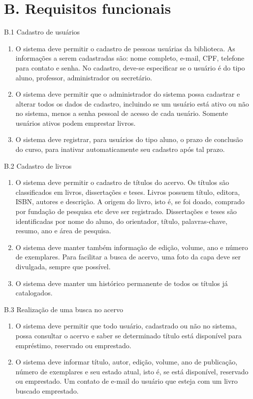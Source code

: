 \documentclass[a4paper]{article}
\begin{document}
	\section*{B. Requisitos funcionais}
	B.1 Cadastro de usuários
		\begin{enumerate}
			\item O sistema deve permitir o cadastro de pessoas usuárias da biblioteca. As informações a serem cadastradas são: nome completo, e-mail, CPF, telefone para contato e senha. No cadastro, deve-se especificar se o usuário é do tipo aluno, professor, administrador ou secretário.
			\item O sistema deve permitir que o administrador do sistema possa cadastrar e alterar todos os dados de cadastro, incluindo se um usuário está ativo ou não no sistema, menos a senha pessoal de acesso de cada usuário. Somente usuários ativos podem emprestar livros.
			\item O sistema deve registrar, para usuários do tipo aluno, o prazo de conclusão do curso, para inativar automaticamente seu cadastro após tal prazo.
		\end{enumerate}
	B.2 Cadastro de livros
		\begin{enumerate}[resume]
			\item O sistema deve permitir o cadastro de títulos do acervo. Os títulos são classificados em livros, dissertações e teses. Livros possuem título, editora, ISBN, autores e descrição. A origem do livro, isto é, se foi doado, comprado por fundação de pesquisa etc deve ser registrado. Dissertações e teses são identificadas por nome do aluno, do orientador, título, palavras-chave, resumo, ano e área de pesquisa.
			\item O sistema deve manter também informação de edição, volume, ano e número de exemplares. Para facilitar a busca de acervo, uma foto da capa deve ser divulgada, sempre que possível.
			\item O sistema deve manter um histórico permanente de todos os títulos já catalogados.
		\end{enumerate}
	B.3 Realização de uma busca no acervo
		\begin{enumerate}[resume]
			\item O sistema deve permitir que todo usuário, cadastrado ou não no sistema, possa consultar o acervo e saber se determinado título está disponível para empréstimo, reservado ou emprestado.
			\item O sistema deve informar título, autor, edição, volume, ano de publicação, número de exemplares e seu estado atual, isto é, se está disponível, reservado ou emprestado. Um contato de e-mail do usuário que esteja com um livro buscado emprestado.
		\end{enumerate}
\end{document}
